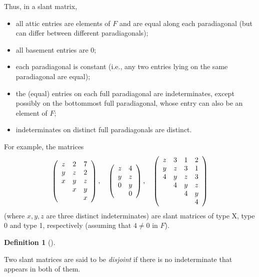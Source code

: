 \documentclass[numbers=enddot,12pt,final,onecolumn,notitlepage]{scrartcl}%
\theoremstyle{definition}
\newtheorem{defi}[theo]{Definition}
\newenvironment{definition}[1][]
{\begin{defi}[#1]\begin{leftbar}}
{\end{leftbar}\end{defi}}
\theoremstyle{plainsl}
\begin{document}
Thus, in a slant matrix,

\begin{itemize}
\item all attic entries are elements of $F$ and are equal along each
paradiagonal (but can differ between different paradiagonals);

\item all basement entries are $0$;

\item each paradiagonal is constant (i.e., any two entries lying on the same
paradiagonal are equal);

\item the (equal) entries on each full paradiagonal are indeterminates, except
possibly on the bottommost full paradiagonal, whose entry can also be an
element of $F$;

\item indeterminates on distinct full paradiagonals are distinct.
\end{itemize}

For example, the matrices%
\[
\left(
\begin{array}
[c]{ccc}%
z & 2 & 7\\
y & z & 2\\
x & y & z\\
& x & y\\
&  & x
\end{array}
\right)  ,\ \ \ \left(
\begin{array}
[c]{cc}%
z & 4\\
y & z\\
0 & y\\
& 0
\end{array}
\right)  ,\ \ \ \left(
\begin{array}
[c]{cccc}%
z & 3 & 1 & 2\\
y & z & 3 & 1\\
4 & y & z & 3\\
& 4 & y & z\\
&  & 4 & y\\
&  &  & 4
\end{array}
\right)
\]
(where $x,y,z$ are three distinct indeterminates) are slant matrices of type
X, type 0 and type 1, respectively (assuming that $4\neq0$ in $F$).

\begin{definition}
Two slant matrices are said to be \emph{disjoint} if there is no indeterminate
that appears in both of them.
\end{definition}
\end{document}
